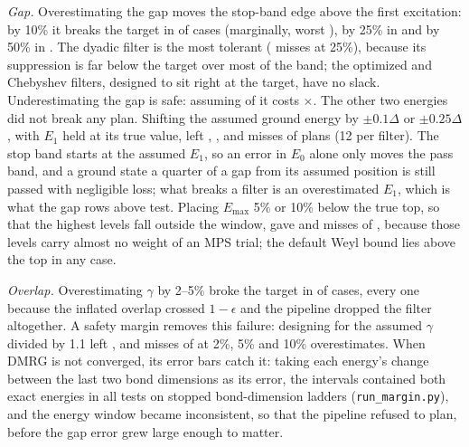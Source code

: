 \documentclass[aps,pra,twocolumn,superscriptaddress,nofootinbib]{revtex4-2}
\begin{document}
\emph{Gap.} Overestimating the gap moves the stop-band edge above the first excitation: by 10\% it breaks the target
in \sensGapOneTenMiss{} of \sensGapN{} cases (marginally, worst \sensGapOneTenWorst), by 25\% in
\sensGapOneQuarterMiss{} and by 50\% in \sensGapOneHalfMiss. The dyadic filter is the most tolerant
(\sensDyaQuarterMiss{} misses at 25\%), because its suppression is far below the target over most of the band; the
optimized and Chebyshev filters, designed to sit right at the target, have no slack. Underestimating the gap is safe:
assuming \gapMarginF{} of it costs \gapMarginCost$\times$. The other two energies did not break any plan. Shifting
the assumed ground energy by $\pm0.1\Delta$ or $\pm0.25\Delta$, with $E_1$ held at its true value, left
\sIIEZeromQMiss, \sIIEZeromTMiss, \sIIEZeropTMiss{} and \sIIEZeropQMiss{} misses of \sIIEZeromQN{}
plans (12 per filter). The stop band starts at the assumed $E_1$, so an error in $E_0$ alone only moves the pass band, and a
ground state a quarter of a gap from its assumed position is still passed with negligible loss; what breaks a filter
is an overestimated $E_1$, which is what the gap rows above test. Placing $E_{\max}$ 5\% or 10\% below the true top, so that the
highest levels fall outside the window, gave \sIIEmaxNineFiveMiss{} and \sIIEmaxNineMiss{} misses of
\sIIEmaxNineN, because those levels carry almost no weight of an MPS trial; the default Weyl bound lies above the top
in any case.

\emph{Overlap.} Overestimating $\gamma$ by 2--5\% broke the target in \sensGammaMiss{} of \sensGammaN{} cases, every
one because the inflated overlap crossed $1-\epsilon$ and the pipeline dropped the filter altogether. A safety margin
removes this failure: designing for the assumed $\gamma$ divided by 1.1 left \sIIgammaMOneOTwoMiss, \sIIgammaMOneOFiveMiss{} and
\sIIgammaMOneOneMiss{} misses of \sIIgammaMOneOneN{} at 2\%, 5\% and 10\% overestimates. When DMRG is not converged, its
error bars catch it: taking each energy's change between the last two bond dimensions as its error, the intervals
contained both exact energies in all \mgN{} tests on stopped bond-dimension ladders (\texttt{run\_margin.py}), and
the energy window became inconsistent, so that the pipeline refused to plan, before the gap error grew large enough
to matter.
\end{document}
